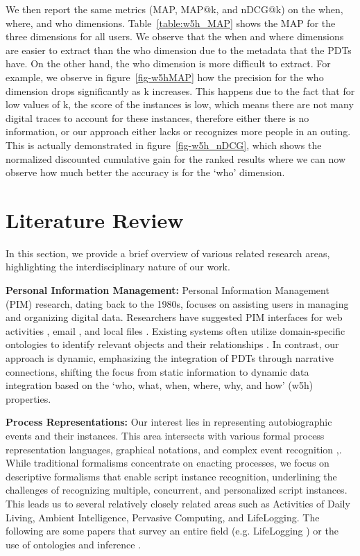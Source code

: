 \documentclass[11pt]{article}
\begin{document}
We then report the same metrics (MAP, MAP@k, and nDCG@k) on the when, where, and who dimensions.
Table~\ref{table:w5h_MAP} shows the MAP for the three dimensions for all users. We observe that the when and where dimensions are easier to extract than the who dimension due to the metadata that the PDTs have. On the other hand, the who dimension is more difficult to extract. For example, we observe in figure~\ref{fig-w5hMAP} how the precision for the who dimension drops significantly as k increases. This happens due to the fact that for low values of k, the score of the instances is low, which means there are not many digital traces to account for these instances, therefore either there is no information, or our approach either lacks or recognizes more people in an outing. This is actually demonstrated in figure~\ref{fig-w5h_nDCG}, which shows the normalized discounted cumulative gain for the ranked results where we can now observe how much better the accuracy is for the `who' dimension. 

\section{Literature Review}
In this section, we provide a brief overview of various related research areas, highlighting the interdisciplinary nature of our work.

\textbf{Personal Information Management:}
Personal Information Management (PIM) research, dating back to the 1980s, focuses on assisting users in managing and organizing digital data. Researchers have suggested PIM interfaces for web activities \cite{stuff,kaptelinin2003umea,murakami2012system}, email \cite{ayodele2012machine,whittaker2006email}, and local files \cite{barreau1995finding,barreau1995context}. Existing systems often utilize domain-specific ontologies to identify relevant objects and their relationships \cite{haystack,ontopim}. In contrast, our approach is dynamic, emphasizing the integration of PDTs through narrative connections, shifting the focus from static information to dynamic data integration based on the `who, what, when, where, why, and how' (w5h) properties. 

\textbf{Process Representations:}
Our interest lies in representing autobiographic events and their instances. This area intersects with various formal process representation languages, graphical notations, and complex event recognition \cite{yawl2005},\cite{declarativeBPM15}. While traditional formalisms concentrate on enacting processes, we focus on descriptive formalisms that enable script instance recognition, underlining the challenges of recognizing multiple, concurrent, and personalized script instances. This leads us to
several relatively closely related areas such as Activities of Daily Living, Ambient Intelligence, Pervasive Computing, and LifeLogging. The following are some papers that survey an entire field
(e.g. LifeLogging  \cite{lifelogging}) or the use of ontologies and inference
\cite{bikakis2007survey,behavRecognitionSurvey14,alevizos2017probabilistic}.
\end{document}
